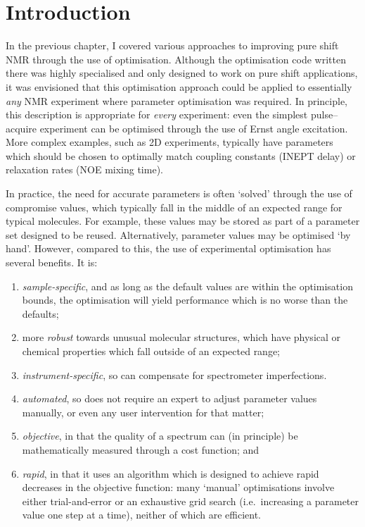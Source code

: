 \section{Introduction}
\label{sec:poise__introduction}

In the previous chapter, I covered various approaches to improving pure shift NMR through the use of optimisation.
Although the optimisation code written there was highly specialised and only designed to work on pure shift applications, it was envisioned that this optimisation approach could be applied to essentially \textit{any} NMR experiment where parameter optimisation was required.
In principle, this description is appropriate for \textit{every} experiment: even the simplest pulse--acquire experiment can be optimised through the use of Ernst angle excitation.
More complex examples, such as 2D experiments, typically have parameters which should be chosen to optimally match coupling constants (INEPT delay) or relaxation rates (NOE mixing time).

In practice, the need for accurate parameters is often `solved' through the use of compromise values, which typically fall in the middle of an expected range for typical molecules.
For example, these values may be stored as part of a parameter set designed to be reused.
Alternatively, parameter values may be optimised `by hand'.
However, compared to this, the use of experimental optimisation has several benefits.
It is:
\begin{enumerate}
    \item \textit{sample-specific}, and as long as the default values are within the optimisation bounds, the optimisation will yield performance which is no worse than the defaults;
    \item more \textit{robust} towards unusual molecular structures, which have physical or chemical properties which fall outside of an expected range;
    \item \textit{instrument-specific}, so can compensate for spectrometer imperfections.
    \item \textit{automated}, so does not require an expert to adjust parameter values manually, or even any user intervention for that matter;
    \item \textit{objective}, in that the quality of a spectrum can (in principle) be mathematically measured through a cost function; and
    \item \textit{rapid}, in that it uses an algorithm which is designed to achieve rapid decreases in the objective function: many `manual' optimisations involve either trial-and-error or an exhaustive grid search (i.e.\ increasing a parameter value one step at a time), neither of which are efficient.
\end{enumerate}

